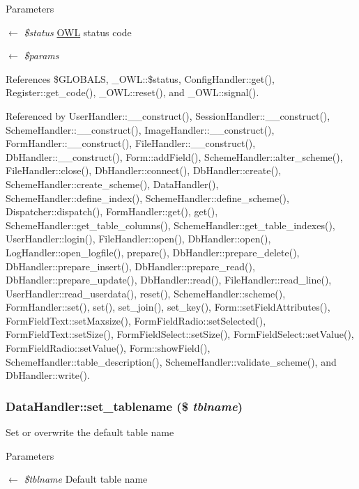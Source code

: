 \begin{DoxyParams}{Parameters}
\item[\mbox{$\leftarrow$} {\em \$status}]\hyperlink{classOWL}{OWL} status code \item[\mbox{$\leftarrow$} {\em \$params}]\end{DoxyParams}


References \$GLOBALS, \_\-OWL::\$status, ConfigHandler::get(), Register::get\_\-code(), \_\-OWL::reset(), and \_\-OWL::signal().



Referenced by UserHandler::\_\-\_\-construct(), SessionHandler::\_\-\_\-construct(), SchemeHandler::\_\-\_\-construct(), ImageHandler::\_\-\_\-construct(), FormHandler::\_\-\_\-construct(), FileHandler::\_\-\_\-construct(), DbHandler::\_\-\_\-construct(), Form::addField(), SchemeHandler::alter\_\-scheme(), FileHandler::close(), DbHandler::connect(), DbHandler::create(), SchemeHandler::create\_\-scheme(), DataHandler(), SchemeHandler::define\_\-index(), SchemeHandler::define\_\-scheme(), Dispatcher::dispatch(), FormHandler::get(), get(), SchemeHandler::get\_\-table\_\-columns(), SchemeHandler::get\_\-table\_\-indexes(), UserHandler::login(), FileHandler::open(), DbHandler::open(), LogHandler::open\_\-logfile(), prepare(), DbHandler::prepare\_\-delete(), DbHandler::prepare\_\-insert(), DbHandler::prepare\_\-read(), DbHandler::prepare\_\-update(), DbHandler::read(), FileHandler::read\_\-line(), UserHandler::read\_\-userdata(), reset(), SchemeHandler::scheme(), FormHandler::set(), set(), set\_\-join(), set\_\-key(), Form::setFieldAttributes(), FormFieldText::setMaxsize(), FormFieldRadio::setSelected(), FormFieldText::setSize(), FormFieldSelect::setSize(), FormFieldSelect::setValue(), FormFieldRadio::setValue(), Form::showField(), SchemeHandler::table\_\-description(), SchemeHandler::validate\_\-scheme(), and DbHandler::write().

\subsubsection[{set\_\-tablename}]{\setlength{\rightskip}{0pt plus 5cm}DataHandler::set\_\-tablename (\$ {\em tblname})}\label{classDataHandler_abcb68472abd7da8ee6296421f0a7f2e9}
Set or overwrite the default table name


\begin{DoxyParams}{Parameters}
\item[\mbox{$\leftarrow$} {\em \$tblname}]Default table name \end{DoxyParams}
